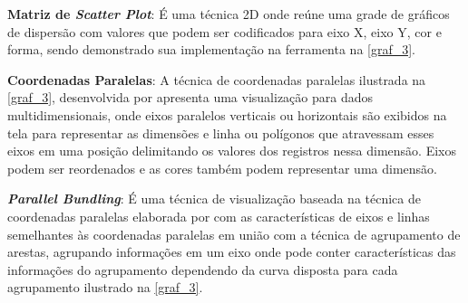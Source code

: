 \documentclass[
	12pt,				%
	openright,			%
	oneside,			%
	a4paper,			%
	english,			%
	brazil				%
	]{abntex2}
\begin{document}
\textbf{Matriz de \textit{Scatter Plot}}:
    É uma técnica 2D onde reúne uma grade de gráficos de dispersão com valores que podem ser codificados para eixo X, eixo Y, cor e forma, sendo demonstrado sua implementação na ferramenta na \autoref{graf_3}.
    
\textbf{Coordenadas Paralelas}:
    A técnica de coordenadas paralelas ilustrada na \autoref{graf_3}, desenvolvida por \cite{inselberg1985plane} apresenta uma visualização para dados multidimensionais, onde eixos paralelos verticais ou horizontais são exibidos na tela para representar as dimensões e linha ou polígonos que atravessam esses eixos em uma posição delimitando os valores dos registros nessa dimensão. Eixos podem ser reordenados e as cores também podem representar uma dimensão.

\textbf{\textit{Parallel Bundling}}: É uma técnica de visualização baseada na técnica de coordenadas paralelas elaborada por \cite{divino2017visual} com as características de eixos e linhas semelhantes às coordenadas paralelas em união com a técnica \cite{zhou2013edge} de agrupamento de arestas, agrupando informações em um eixo onde pode conter características das informações do agrupamento dependendo da curva disposta para cada agrupamento ilustrado na \autoref{graf_3}.
    
\end{document}

